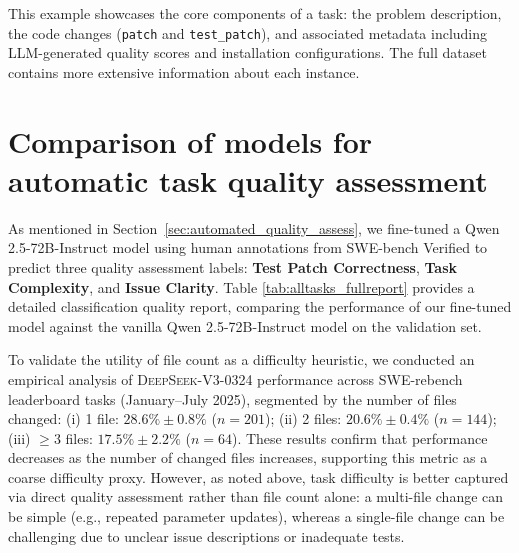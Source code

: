 \documentclass[dandb]{article}
\begin{document}
This example showcases the core components of a task: the problem description, the code changes (\verb|patch| and \verb|test_patch|), and associated metadata including LLM-generated quality scores and installation configurations. The full dataset contains more extensive information about each instance.

\section{Comparison of models for automatic task quality assessment}
\label{sec:auto_label_metrics}
As mentioned in Section~\ref{sec:automated_quality_assess}, we fine-tuned a Qwen 2.5-72B-Instruct model using human annotations from SWE-bench Verified to predict three quality assessment labels: \textbf{Test Patch Correctness}, \textbf{Task Complexity}, and \textbf{Issue Clarity}. Table \ref{tab:alltasks_fullreport} provides a detailed classification quality report, comparing the performance of our fine-tuned model against the vanilla Qwen 2.5-72B-Instruct model on the validation set.

To validate the utility of file count as a difficulty heuristic, we conducted an empirical analysis of \textsc{DeepSeek-V3-0324} performance across SWE-rebench leaderboard tasks (January--July 2025), segmented by the number of files changed: (i) 1 file: $28.6\% \pm 0.8\%$ ($n=201$); (ii) 2 files: $20.6\% \pm 0.4\%$ ($n=144$); (iii) $\geq 3$ files: $17.5\% \pm 2.2\%$ ($n=64$). These results confirm that performance decreases as the number of changed files increases, supporting this metric as a coarse difficulty proxy. However, as noted above, task difficulty is better captured via direct quality assessment rather than file count alone: a multi-file change can be simple (e.g., repeated parameter updates), whereas a single-file change can be challenging due to unclear issue descriptions or inadequate tests.
\end{document}
